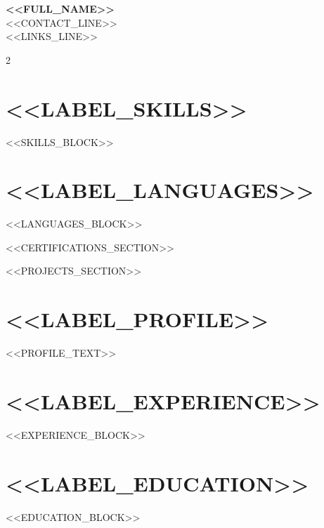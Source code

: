 \documentclass[a4paper,10pt]{article}
\begin{document}
\begin{center}
{\LARGE\bfseries\color{accent} <<FULL_NAME>>}\\[4pt]
{\small <<CONTACT_LINE>>}\\[2pt]
{\small <<LINKS_LINE>>}
\end{center}

\vspace{4pt}

\begin{paracol}{2}


\section{<<LABEL_SKILLS>>}
<<SKILLS_BLOCK>>

\vspace{6pt}

\section{<<LABEL_LANGUAGES>>}
<<LANGUAGES_BLOCK>>

\vspace{6pt}

<<CERTIFICATIONS_SECTION>>

\vspace{6pt}

<<PROJECTS_SECTION>>

\switchcolumn

\section{<<LABEL_PROFILE>>}
<<PROFILE_TEXT>>

\section{<<LABEL_EXPERIENCE>>}
<<EXPERIENCE_BLOCK>>

\section{<<LABEL_EDUCATION>>}
<<EDUCATION_BLOCK>>

\end{paracol}
\end{document}
